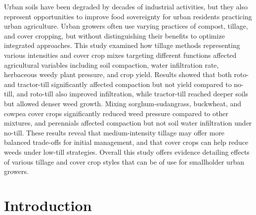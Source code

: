 \documentclass[
  12pt,
]{article}
\begin{document}
Urban soils have been degraded by decades of industrial activities, but they also represent opportunities to improve food sovereignty for urban residents practicing urban agriculture.
Urban growers often use varying practices of compost, tillage, and cover cropping, but without distinguishing their benefits to optimize integrated approaches.
This study examined how tillage methods representing various intensities and cover crop mixes targeting different functions affected agricultural variables including soil compaction, water infiltration rate, herbaceous weedy plant pressure, and crop yield.
Results showed that both roto- and tractor-till significantly affected compaction but not yield compared to no-till, and roto-till also improved infiltration, while tractor-till reached deeper soils but allowed denser weed growth.
Mixing sorghum-sudangrass, buckwheat, and cowpea cover crops significantly reduced weed pressure compared to other mixtures, and perennials affected compaction but not soil water infiltration under no-till.
These results reveal that medium-intensity tillage may offer more balanced trade-offs for initial management, and that cover crops can help reduce weeds under low-till strategies.
Overall this study offers evidence detailing effects of various tillage and cover crop styles that can be of use for smallholder urban growers.

\newpage

\hypertarget{introduction}{%
\section{Introduction}\label{introduction}}
\end{document}
